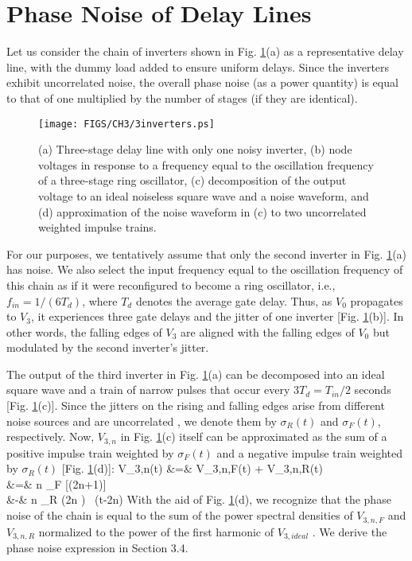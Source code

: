  
\section{Phase Noise of Delay Lines}

Let us consider the chain of inverters shown in Fig. \ref{fig:chain}(a) as a representative delay line, with the dummy load added to ensure uniform delays. Since the inverters
exhibit uncorrelated noise, the overall phase noise (as a power quantity) is equal to that of one multiplied by the number of stages (if they are identical). 
\begin{figure}[htb!]
\centering
\texttt{[image: FIGS/CH3/3inverters.ps]}
\caption{(a) Three-stage delay line with only one noisy inverter, (b) node voltages in response to a frequency equal to the oscillation frequency of a three-stage ring
oscillator, (c) decomposition of the output voltage to an ideal noiseless square wave and a noise waveform, and (d) approximation of the noise waveform in (c) to two
uncorrelated weighted impulse trains.}
\label{fig:chain}
\end{figure}

 
For our purposes, we tentatively assume that only the second inverter in Fig. \ref{fig:chain}(a) has noise. We also select the input frequency equal to the oscillation
frequency of this chain as if it were reconfigured to become a ring oscillator, i.e., $f_{in}=1/(6 T_d)$, where $T_d$ denotes the average gate delay. 
Thus, as $V_0$ propagates to $V_3$, it experiences three gate delays and the jitter of one inverter [Fig. \ref{fig:chain}(b)]. In other words, the falling edges of $V_3$ are
aligned with the falling edges of $V_0$ but modulated by the second inverter's jitter.
 
The output of the third inverter in Fig. \ref{fig:chain}(a) can be decomposed into an ideal square wave and a train of narrow pulses \cite{Perrott,Galton} that occur every $3 T_d=T_{in}/2$
seconds [Fig. \ref{fig:chain}(c)]. Since the jitters on the rising and falling edges arise from different noise sources and are
uncorrelated \cite{Homayoun}, we denote them by $\sigma_R(t)$ and $\sigma_F(t)$, respectively. Now, $V_{3,n}$ in Fig. \ref{fig:chain}(c) itself can be approximated as the
sum of a positive impulse train weighted by $\sigma_F(t)$ and a negative impulse train weighted by $\sigma_R(t)$ [Fig. \ref{fig:chain}(d)]: 
\ber
V_{3,n}(t) &=& V_{3,n,F}(t) + V_{3,n,R}(t) \nonumber\\
&=& \SumAll n \sigma_F [(2n+1)] ~\delta [t-(2n+1)\frac{T_{in}}{2}] \nonumber\\
&-& \SumAll n \sigma_R (2n ) ~\delta (t-2n)
\label{v3n}
\eer
With the aid of Fig. \ref{fig:chain}(d), we recognize that 
the phase noise of the chain is equal to the sum of the power spectral densities of $V_{3,n,F}$ and $V_{3,n,R}$ normalized to the power of the first
harmonic of $V_{3,ideal}$ \cite{Homayoun}. We derive the phase noise expression in Section 3.4.


